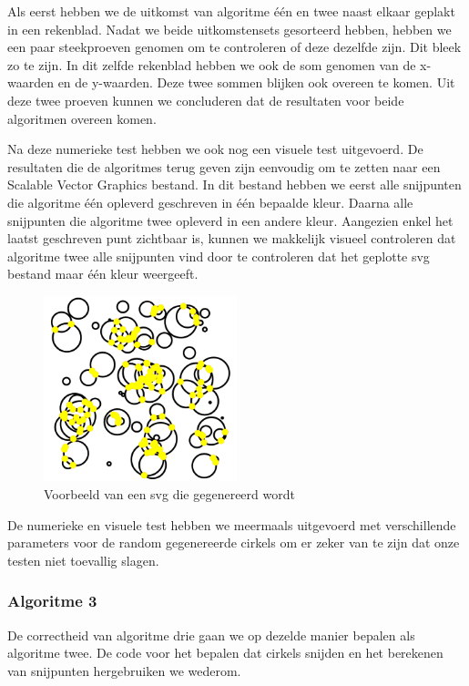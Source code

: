 \documentclass[11pt,a4paper]{article}
\begin{document}
Als eerst hebben we de uitkomst van algoritme \'e\'en en twee naast elkaar geplakt in een rekenblad. Nadat we beide uitkomstensets gesorteerd hebben, hebben we een paar steekproeven genomen om te controleren of deze dezelfde zijn. Dit bleek zo te zijn. In dit zelfde rekenblad hebben we ook de som genomen van de x-waarden en de y-waarden. Deze twee sommen blijken ook overeen te komen. Uit deze twee proeven kunnen we concluderen dat de resultaten voor beide algoritmen overeen komen.

Na deze numerieke test hebben we ook nog een visuele test uitgevoerd. De resultaten die de algoritmes terug geven zijn eenvoudig om te zetten naar een Scalable Vector Graphics bestand. In dit bestand hebben we eerst alle snijpunten die algoritme \'e\'en opleverd geschreven in \'e\'en bepaalde kleur. Daarna alle snijpunten die algoritme twee opleverd in een andere kleur. Aangezien enkel het laatst geschreven punt zichtbaar is, kunnen we makkelijk visueel controleren dat algoritme twee alle snijpunten vind door te controleren dat het geplotte svg bestand maar \'e\'en kleur weergeeft.

\begin{figure}[H]
\centering
\includegraphics[width=0.5\textwidth]{vb_svg.png}
\caption*{Voorbeeld van een svg die gegenereerd wordt}
\end{figure}

De numerieke en visuele test hebben we meermaals uitgevoerd met verschillende parameters voor de random gegenereerde cirkels om er zeker van te zijn dat onze testen niet toevallig slagen.

\subsubsection*{Algoritme 3}

De correctheid van algoritme drie gaan we op dezelde manier bepalen als algoritme twee. De code voor het bepalen dat cirkels snijden en het berekenen van snijpunten hergebruiken we wederom.
\end{document}

